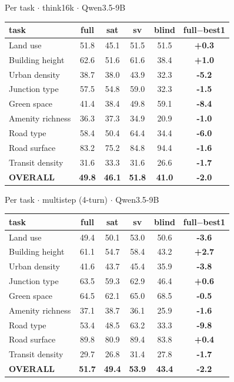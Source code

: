 \documentclass[aspectratio=169]{beamer}
\begin{document}
\begin{frame}{Per task \textbf{$\cdot$} think16k \textbf{$\cdot$} Qwen3.5-9B}
\centering\scriptsize
\begin{tabular}{lcccc>{\bfseries}c}
\toprule
task & full & sat & sv & blind & full$-$best1 \\
\midrule
Land use & 51.8 & 45.1 & 51.5 & 51.5 & +0.3 \\
Building height & 62.6 & 51.6 & 61.6 & 38.4 & +1.0 \\
Urban density & 38.7 & 38.0 & 43.9 & 32.3 & \textcolor{bad}{-5.2} \\
Junction type & 57.5 & 54.8 & 59.0 & 32.3 & \textcolor{bad}{-1.5} \\
Green space & 41.4 & 38.4 & 49.8 & 59.1 & \textcolor{bad}{-8.4} \\
Amenity richness & 36.3 & 37.3 & 34.9 & 20.9 & \textcolor{bad}{-1.0} \\
Road type & 58.4 & 50.4 & 64.4 & 34.4 & \textcolor{bad}{-6.0} \\
Road surface & 83.2 & 75.2 & 84.8 & 94.4 & \textcolor{bad}{-1.6} \\
Transit density & 31.6 & 33.3 & 31.6 & 26.6 & \textcolor{bad}{-1.7} \\
\midrule
\textbf{OVERALL} & \textbf{49.8} & \textbf{46.1} & \textbf{51.8} & \textbf{41.0} & \textbf{\textcolor{bad}{-2.0}} \\
\bottomrule
\end{tabular}
\end{frame}
\begin{frame}{Per task \textbf{$\cdot$} multistep (4-turn) \textbf{$\cdot$} Qwen3.5-9B}
\centering\scriptsize
\begin{tabular}{lcccc>{\bfseries}c}
\toprule
task & full & sat & sv & blind & full$-$best1 \\
\midrule
Land use & 49.4 & 50.1 & 53.0 & 50.6 & \textcolor{bad}{-3.6} \\
Building height & 61.1 & 54.7 & 58.4 & 43.2 & +2.7 \\
Urban density & 41.6 & 43.7 & 45.4 & 35.9 & \textcolor{bad}{-3.8} \\
Junction type & 63.5 & 59.3 & 62.9 & 46.4 & +0.6 \\
Green space & 64.5 & 62.1 & 65.0 & 68.5 & -0.5 \\
Amenity richness & 37.1 & 38.7 & 36.1 & 25.9 & \textcolor{bad}{-1.6} \\
Road type & 53.4 & 48.5 & 63.2 & 33.3 & \textcolor{bad}{-9.8} \\
Road surface & 89.8 & 80.9 & 89.4 & 83.8 & +0.4 \\
Transit density & 29.7 & 26.8 & 31.4 & 27.8 & \textcolor{bad}{-1.7} \\
\midrule
\textbf{OVERALL} & \textbf{51.7} & \textbf{49.4} & \textbf{53.9} & \textbf{43.4} & \textbf{\textcolor{bad}{-2.2}} \\
\bottomrule
\end{tabular}
\end{frame}
\end{document}
